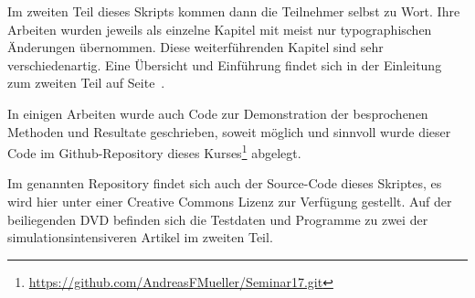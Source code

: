 Im zweiten Teil dieses Skripts kommen dann die Teilnehmer selbst zu Wort.
Ihre Arbeiten wurden jeweils als einzelne
Kapitel mit meist nur typographischen Änderungen übernommen.
Diese weiterführenden Kapitel sind sehr verschiedenartig.
Eine Übersicht und Einführung findet sich in der Einleitung
zum zweiten Teil auf Seite~\pageref{skript:uebersicht}.

In einigen Arbeiten wurde auch Code zur Demonstration der 
besprochenen Methoden und Resultate geschrieben, soweit
möglich und sinnvoll wurde dieser Code im Github-Repository
dieses Kurses\footnote{\url{https://github.com/AndreasFMueller/Seminar17.git}}
abgelegt.

Im genannten Repository findet sich auch der Source-Code dieses
Skriptes, es wird hier unter einer Creative Commons Lizenz
zur Verfügung gestellt.
Auf der beiliegenden DVD befinden sich die Testdaten und Programme
zu zwei der simulationsintensiveren Artikel im zweiten Teil.



